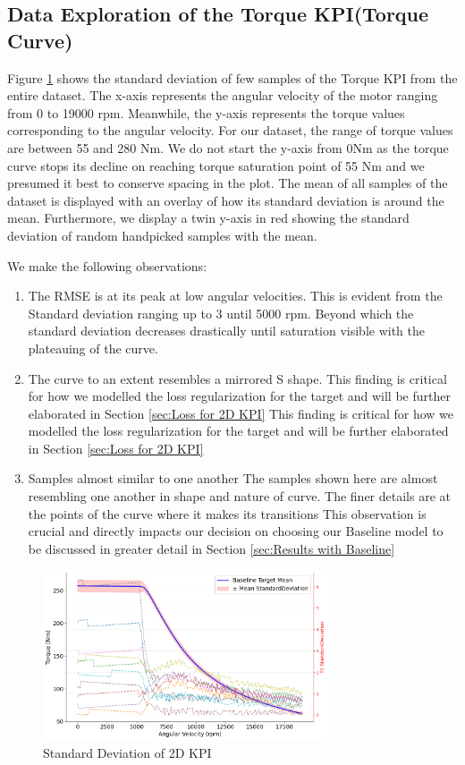\documentclass{report} %
\begin{document}
\subsection{Data Exploration of the Torque \ac{KPI}(Torque Curve)}\label{subsec:Deep Dive into 2D KPI}
Figure \ref{fig:Standard Deviation of 2D KPI} shows the standard deviation of few samples of the Torque \ac{KPI} from the entire dataset.
The x-axis represents the angular velocity of the motor ranging from 0 to 19000 rpm. Meanwhile, the y-axis represents the torque values corresponding to the angular velocity.
For our dataset, the range of torque values are between 55 and 280 Nm. We do not start the y-axis from 0Nm as the torque curve stops its decline on reaching torque 
saturation point of 55 Nm and we presumed it best to conserve spacing in the plot.
The mean of all samples of the dataset is displayed with an overlay of how its standard deviation is around the mean.
Furthermore, we display a twin y-axis in red showing the standard deviation of random handpicked samples with the mean.

We make the following observations:
\begin{enumerate}
    \item The \ac{RMSE} is at its peak at low angular velocities.
    This is evident from the Standard deviation ranging up to 3 until 5000 rpm. Beyond which the standard deviation decreases drastically until 
    saturation visible with the plateauing of the curve.
    \item The curve to an extent resembles a mirrored S shape.
    This finding is critical for how we modelled the loss regularization for the target and will be further elaborated in Section \ref{sec:Loss for 2D KPI}
    This finding is critical for how we modelled the loss regularization for the target and will be further elaborated in Section \ref{sec:Loss for 2D KPI}
    \item Samples almost similar to one another
    The samples shown here are almost resembling one another in shape and nature of curve. The finer details are at the points of the curve where it makes its transitions 
    This observation is crucial and directly impacts our  decision on choosing our Baseline model to be discussed in greater detail in Section \ref{sec:Results with Baseline}
\end{enumerate}

\begin{figure}[H]
    \centering
    \includegraphics[width=0.75\textwidth]{./ReportImages/StandardDeviation_Baseline_y1.png} 
    \caption{Standard Deviation of 2D KPI} 
    \label{fig:Standard Deviation of 2D KPI}
\end{figure}
\end{document}
